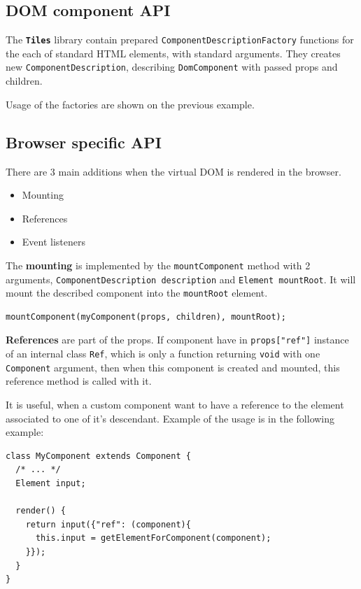 \documentclass[oneside, 12pt]{book}
\newcommand{\tiles}[0]{\textbf{\texttt{Tiles}} }
\begin{document}
  \subsection{DOM component API}\label{subsec:our-api-dom}

    The \tiles library contain prepared \texttt{ComponentDescriptionFactory} functions for the each of standard HTML elements, 
    with standard arguments. 
    They creates new \texttt{ComponentDescription}, describing \texttt{DomComponent} with passed props and children.

    Usage of the factories are shown on the previous example.

  \subsection{Browser specific API}\label{subsec:our-api-browser}
    
    There are 3 main additions when the virtual DOM is rendered in the browser.
    \begin{itemize}
      \item Mounting
      \item References
      \item Event listeners
    \end{itemize}

    The \textbf{mounting} is implemented by the \texttt{mountComponent} method with 2 arguments, 
    \texttt{ComponentDescription description} and \texttt{Element mountRoot}.
    It will mount the described component into the \texttt{mountRoot} element.
\begin{verbatim}
mountComponent(myComponent(props, children), mountRoot);
\end{verbatim}



    \textbf{References} are part of the props. 
    If component have in \texttt{props["ref"]} instance of an internal class \texttt{{\textunderscore}Ref}, 
    which is only a function returning \texttt{void} with one \texttt{Component} argument, 
    then when this component is created and mounted, 
    this reference method is called with it. 

    It is useful, when a custom component want to have a reference to the element associated to one of it's descendant. 
    Example of the usage is in the following example:
\begin{verbatim}
class MyComponent extends Component {
  /* ... */
  Element input;

  render() {
    return input({"ref": (component){
      this.input = getElementForComponent(component);
    }});
  }
}
\end{verbatim}
\end{document}
